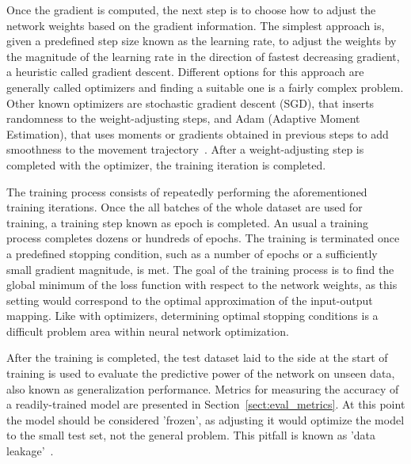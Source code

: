 \documentclass[english,twoside,openright]{UH_DS_MSc}
\begin{document}
Once the gradient is computed, the next step is to choose how to adjust the network weights 
based on the gradient information. The simplest approach is, given a predefined step size 
known as the learning rate, to adjust the weights by the magnitude of the learning rate 
in the direction of fastest decreasing gradient, a heuristic called gradient descent. Different options for this approach 
are generally called optimizers and finding a suitable one is a fairly complex problem.
Other known optimizers are stochastic gradient descent (SGD), that inserts randomness 
to the weight-adjusting steps, and Adam (Adaptive Moment Estimation), that 
uses moments or gradients obtained in previous steps to add smoothness to the 
movement trajectory~\cite{princebook}. After a weight-adjusting step is completed 
with the optimizer, the training iteration is completed.

The training process consists of repeatedly performing the aforementioned training 
iterations. Once the all batches of the whole dataset are used for training,
a training step known as epoch is completed. An usual a training process 
completes dozens or hundreds of epochs. The training is terminated once a predefined 
stopping condition, such as a number of epochs or a sufficiently small gradient 
magnitude, is met. The goal of the training process is to find the global minimum of the loss 
function with respect to the network weights, as this setting would correspond to 
the optimal approximation of the input-output mapping. Like with optimizers, 
determining optimal stopping conditions is a difficult problem area within neural network optimization.

After the training is completed, the test dataset laid to the side at the start of 
training is used to evaluate the predictive power of the network on unseen data, 
also known as generalization performance. Metrics for measuring the accuracy 
of a readily-trained model are presented in Section~\ref{sect:eval_metrics}.
At this point the model should be considered 'frozen', as adjusting it would 
optimize the model to the small test set, not the general problem. This pitfall is 
known as 'data leakage'~\cite{engbook}.
\end{document}
